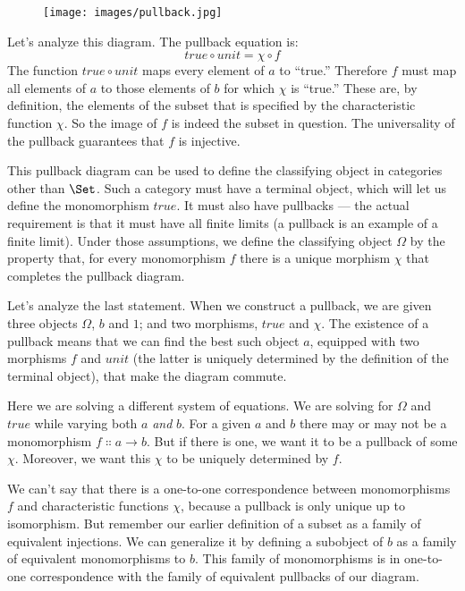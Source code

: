 \begin{figure}[H]
  \centering
  \texttt{[image: images/pullback.jpg]}
\end{figure}

\noindent
Let's analyze this diagram. The pullback equation is:
\[\mathit{true} \circ \mathit{unit} = \chi \circ f\]
The function $\mathit{true} \circ \mathit{unit}$ maps every element of $a$ to
``true.'' Therefore $f$ must map all elements of $a$ to
those elements of $b$ for which $\chi$ is ``true.'' These
are, by definition, the elements of the subset that is specified by the
characteristic function $\chi$. So the image of $f$ is indeed
the subset in question. The universality of the pullback guarantees that
$f$ is injective.

This pullback diagram can be used to define the classifying object in
categories other than $\Set$. Such a category must have a terminal
object, which will let us define the monomorphism $\mathit{true}$. It must
also have pullbacks --- the actual requirement is that it must have all
finite limits (a pullback is an example of a finite limit). Under those
assumptions, we define the classifying object $\Omega$ by the property
that, for every monomorphism $f$ there is a unique morphism
$\chi$ that completes the pullback diagram.

Let's analyze the last statement. When we construct a pullback, we are
given three objects $\Omega$, $b$ and $1$; and two
morphisms, $\mathit{true}$ and $\chi$. The existence of a pullback
means that we can find the best such object $a$, equipped with
two morphisms $f$ and $\mathit{unit}$ (the latter is uniquely
determined by the definition of the terminal object), that make the
diagram commute.

Here we are solving a different system of equations. We are solving for
$\Omega$ and $\mathit{true}$ while varying both $a$ \emph{and}
$b$. For a given $a$ and $b$ there may or may not
be a monomorphism $f \Colon a \to b$. But if there is one, we
want it to be a pullback of some $\chi$. Moreover, we want this
$\chi$ to be uniquely determined by $f$.

We can't say that there is a one-to-one correspondence between
monomorphisms $f$ and characteristic functions $\chi$,
because a pullback is only unique up to isomorphism. But remember our
earlier definition of a subset as a family of equivalent injections. We
can generalize it by defining a subobject of $b$ as a family of
equivalent monomorphisms to $b$. This family of monomorphisms is
in one-to-one correspondence with the family of equivalent pullbacks of
our diagram.

